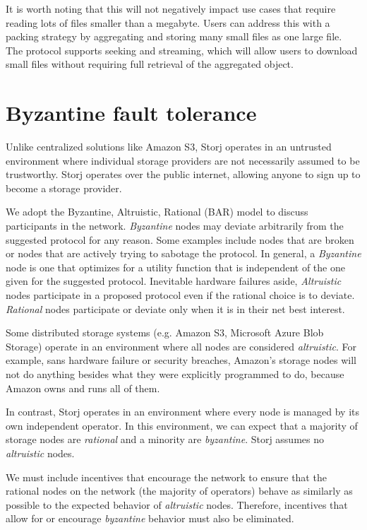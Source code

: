 \documentclass[11pt,fleqn,openany]{book}
\begin{document}
It is worth noting that this will not negatively impact use cases that
require reading lots of files smaller than a megabyte. Users can address this
with a packing strategy by aggregating and storing many small files as one
large file.
The protocol supports seeking and streaming, which will allow users to download small files
without requiring full retrieval of the aggregated object.

\section{Byzantine fault tolerance}

Unlike centralized solutions like Amazon S3, Storj operates in an untrusted
environment where individual storage providers are not necessarily assumed to be
trustworthy. Storj operates over the public internet, allowing anyone to sign
up to become a storage provider.

We adopt the Byzantine, Altruistic, Rational (BAR) model \cite{bar} to discuss
participants in the network.
{\em Byzantine} nodes may deviate arbitrarily from the suggested protocol for
any reason. Some examples include nodes that are broken or nodes that
are actively trying to sabotage the protocol. In general, a {\em Byzantine} node is
one that optimizes for a utility function that is independent of the one
given for the suggested protocol.
Inevitable hardware failures aside, {\em Altruistic} nodes
participate in a proposed protocol even if the rational choice is to deviate.
{\em Rational} nodes participate or deviate only when it
is in their net best interest.

Some distributed storage systems (e.g. Amazon S3, Microsoft Azure Blob Storage)
operate in an environment
where all nodes are considered {\em altruistic}. For example, sans hardware failure
or security breaches, Amazon's storage nodes
will not do anything besides what they were explicitly programmed to do,
because Amazon owns and runs all of them.

In contrast, Storj operates in an environment where every node is
managed by its own independent operator.
In this environment, we can expect that a majority
of storage nodes are {\em rational} and a minority are {\em byzantine}. Storj assumes no
{\em altruistic} nodes.

We must include incentives that encourage the network to ensure that the rational nodes on the network (the majority of operators) behave as similarly as possible to the expected behavior of {\em altruistic} nodes. Therefore, incentives that allow for or encourage {\em byzantine} behavior must also be eliminated.
\end{document}
